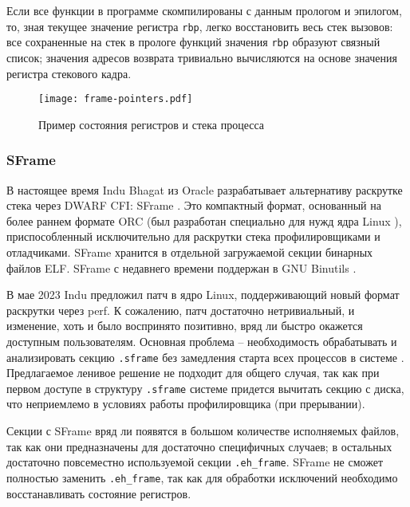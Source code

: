 Если все функции в программе скомпилированы с данным прологом и эпилогом,
то, зная текущее значение регистра \verb!rbp!, легко восстановить весь стек вызовов: все сохраненные на стек в прологе функций
значения \verb!rbp! образуют связный список; значения адресов возврата тривиально вычисляются на основе значения регистра стекового кадра.

\begin{figure}[H]
    \centering
    \texttt{[image: frame-pointers.pdf]}
    \caption{Пример состояния регистров и стека процесса}
    \label{fig:fp}
\end{figure}



\subsubsection{SFrame}
В настоящее время Indu Bhagat из Oracle разрабатывает альтернативу раскрутке стека
через DWARF CFI: SFrame \cite{sframe:phoronix, sframe:lwn}.
Это компактный формат, основанный на более раннем формате ORC (был разработан специально для нужд ядра Linux \cite{orc}),
приспособленный исключительно для раскрутки стека профилировщиками и отладчиками.
SFrame хранится в отдельной загружаемой секции бинарных файлов ELF.
SFrame с недавнего времени поддержан в GNU Binutils \cite{sframe:commits}.

В мае 2023 Indu предложил патч в ядро Linux, поддерживающий новый формат раскрутки через perf.
К сожалению, патч достаточно нетривиальный, и изменение, хоть и было воспринято позитивно, вряд ли быстро окажется доступным пользователям.
Основная проблема – необходимость обрабатывать и анализировать секцию \lstinline!.sframe! без замедления
старта всех процессов в системе \cite{sframe:ml}. Предлагаемое ленивое решение не подходит для общего случая, так как при первом доступе в
структуру \lstinline!.sframe! системе придется вычитать секцию с диска, что неприемлемо в условиях работы профилировщика (при прерывании).

Секции с SFrame вряд ли появятся в большом количестве исполняемых файлов, так как они предназначены для достаточно
специфичных случаев; в остальных достаточно повсеместно используемой секции \lstinline!.eh_frame!.
SFrame не сможет полностью заменить \lstinline!.eh_frame!, так как для обработки исключений необходимо восстанавливать состояние регистров.

